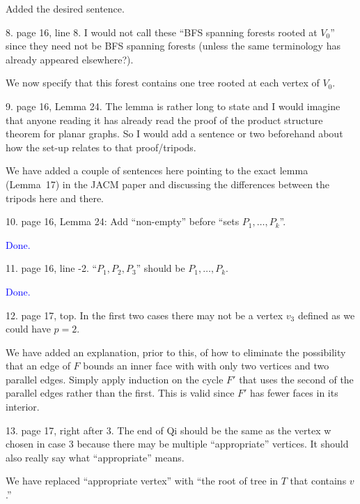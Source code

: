 \documentclass[12pt]{article}
\newcommand{\done}{\textcolor{blue}{Done.}}
\newenvironment{response}{\color{blue}}{}
\begin{document}
\begin{response}
	Added the desired sentence.
\end{response}

8. page 16, line 8. I would not call these “BFS spanning forests rooted
at $V_0$” since they need not be BFS spanning forests (unless the same
terminology has already appeared elsewhere?).

\begin{response}
  We now specify that this forest contains one tree rooted at each vertex of $V_0$.
\end{response}

9. page 16, Lemma 24. The lemma is rather long to state and I would
imagine that anyone reading it has already read the proof of the product
structure theorem for planar graphs. So I would add a sentence or two
beforehand about how the set-up relates to that proof/tripods.

\begin{response}
  We have added a couple of sentences here pointing to the exact lemma (Lemma~17) in the JACM paper and discussing the differences between the tripods here and there.
\end{response}

10. page 16, Lemma 24: Add “non-empty” before “sets $P_1,\dots,P_k$”.

\done

11. page 16, line -2. “$P_1, P_2, P_3$” should be $P_1,\dots,P_k$.

\done

12. page 17, top. In the first two cases there may not be a vertex $v_3$ defined
as we could have $p=2$.

\begin{response}
  We have added an explanation, prior to this, of how to eliminate the possibility that an edge of $F$ bounds an inner face with with only two vertices and two parallel edges.  Simply apply induction on the cycle $F'$ that uses the second of the parallel edges rather than the first.  This is valid since $F'$ has fewer faces in its interior.
\end{response}


13. page 17, right after 3. The end of Qi should be the same as the vertex w
chosen in case 3 because there may be multiple “appropriate” vertices.
It should also really say what “appropriate” means.

\begin{response}
  We have replaced ``appropriate vertex'' with ``the root of tree in $T$ that contains $v$.''
\end{response}
\end{document}

